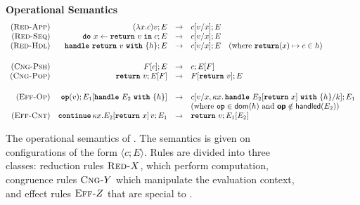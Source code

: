 \begin{figure}[ht]
\begin{eff-desc}
{\noindent\textbf{Operational Semantics}}
  {\scriptsize
\[
  \begin{array}{rrcl}
  \reductionRule{App} & \transition{\effconfiguration{(\function{x}{c})v}{E}}{\effconfiguration{c[v/x]}{E}}\\
  \reductionRule{Seq} & \transition{\effconfiguration{\bind{x}{\return{v}}{c}}{E}}{\effconfiguration{c[v/x]}{E}}\\
  \reductionRule{Hdl} & \transition{\effconfiguration{\handleWith{\return{v}}{h}}{E}}{\effconfiguration{c[v/x]}{E}} \quad (\text{where $\returnHandler{x}{c} \in h$)}\\
  \vspace{1mm} \\ 
  \congruenceRule{Psh} & \transition{\effconfiguration{F[c]}{E}}{\effconfiguration{c}{E[F]}} \\
  \congruenceRule{Pop} & \transition{\effconfiguration{\return{v}}{E[F]}}{\effconfiguration{F[\return{v}]}{E}}\\
  \vspace{1mm} \\
  \effectRule{Op} & \transition{\effconfiguration{\op{v}}{E_1[\handleWith{E_2}{h}]}}\effconfiguration{c[v/x, \kappa x. \, \handleWith{E_2[\return{x}]}{h} / k]}{E_1}\\
  &&& \text{(where $\textbf{\texttt{op}} \in \textsf{dom}(h)$ and $\textbf{\textsf{op}} \notin \textsf{handled}(E_2)$)}\\
  \effectRule{Cnt} & \transition{\effconfiguration{\continue{\kappa x. E_2[\return{x}]}{v}}{E_1}}{\effconfiguration{\return{v}}{E_1[E_2]}}

\end{array}
\]
  }
\end{eff-desc}
\caption{The operational semantics of \efflang. The semantics is given on configurations of the form $\langle c; E \rangle$. Rules are divided into three classes: reduction rules $\textsc{Red-}X$, which perform computation, congruence rules $\textsc{Cng-}Y$ which manipulate the evaluation context, and effect rules $\textsc{Eff-}Z$ that are special to \efflang{}.}
\label{fig:efflang-opsem}
\end{figure}


